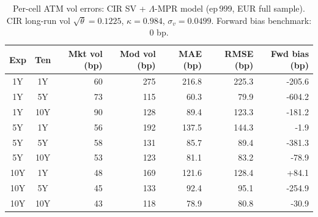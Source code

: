 \begin{table}[H]
\centering
\caption{Per-cell ATM vol errors: CIR SV + $\Lambda$-MPR model (ep\,999, EUR full sample). CIR long-run vol $\sqrt{\theta}=0.1225$, $\kappa=0.984$, $\sigma_v=0.0499$. Forward bias benchmark: 0 bp.}
\label{tab:sv_lambda_per_cell_final}
\small
\begin{tabular}{@{}ccrrrrr@{}}
\toprule
\textbf{Exp} & \textbf{Ten} & \textbf{Mkt vol (bp)} & \textbf{Mod vol (bp)} & \textbf{MAE (bp)} & \textbf{RMSE (bp)} & \textbf{Fwd bias (bp)} \\
\midrule
  1Y & 1Y & 60 & 275 & 216.8 & 225.3 & -205.6 \\
  1Y & 5Y & 73 & 115 & 60.3 & 79.9 & -604.2 \\
  1Y & 10Y & 90 & 128 & 89.4 & 123.3 & -181.2 \\
  \midrule
  5Y & 1Y & 56 & 192 & 137.5 & 144.3 & -1.9 \\
  5Y & 5Y & 58 & 131 & 85.7 & 89.4 & -381.3 \\
  5Y & 10Y & 53 & 123 & 81.1 & 83.2 & -78.9 \\
  \midrule
  10Y & 1Y & 48 & 169 & 121.6 & 128.4 & +84.1 \\
  10Y & 5Y & 45 & 133 & 92.4 & 95.1 & -254.9 \\
  10Y & 10Y & 43 & 118 & 78.9 & 80.8 & -30.9 \\
\bottomrule
\end{tabular}
\end{table}